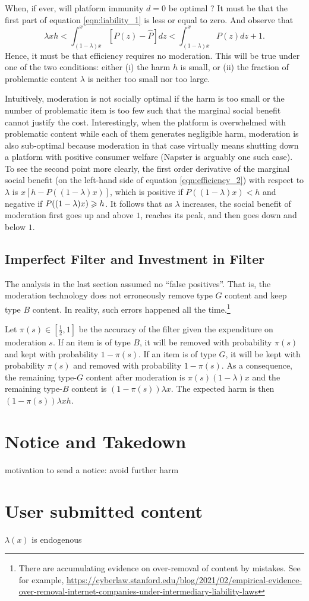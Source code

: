 When, if ever, will platform immunity $d=0$ be optimal ? It must be that the first part of equation \ref{eqn:liability_1} is less or equal to zero. And observe that 
\begin{equation*}
    \lambda xh < \int_{(1-\lambda)x}^x [P(z)-\hat{P}]dz < \int_{(1-\lambda)x}^x P(z)dz + 1.
\end{equation*}
Hence, it must be that efficiency requires no moderation. This will be true under one of the two conditions: either (i) the harm $h$ is small, or (ii) the fraction of problematic content $\lambda$ is neither too small nor too large. 

Intuitively, moderation is not socially optimal if the harm is too small or the number of problematic item is too few such that the marginal social benefit cannot justify the cost. Interestingly, when the platform is overwhelmed with problematic content while each of them generates negligible harm, moderation is also sub-optimal because moderation in that case virtually means shutting down a platform with positive consumer welfare (Napster is arguably one such case). 
To see the second point more clearly, the first order derivative of the marginal social benefit (on the left-hand side of equation \ref{eqn:efficiency_2}) with respect to $\lambda$ is $x[h-P((1-\lambda)x)]$, which is positive if $P((1-\lambda)x)<h$ and negative if $P((1-\lambda)x)\geqslant h$. It follows that as $\lambda$ increases, the social benefit of moderation first goes up and above $1$, reaches its peak, and then goes down and below $1$. 



\subsection{Imperfect Filter and Investment in Filter}
The analysis in the last section assumed no ``false positives''. That is, the moderation technology does not erroneously remove type $G$ content and keep type $B$ content. In reality, such errors happened all the time.\footnote{There are accumulating evidence on over-removal of content by mistakes. See for example, \url{https://cyberlaw.stanford.edu/blog/2021/02/empirical-evidence-over-removal-internet-companies-under-intermediary-liability-laws}}

Let $\pi(s)\in [\frac{1}{2},1]$ be the accuracy of the filter given the expenditure on moderation $s$. If an item is of type $B$, it will be removed with probability $\pi(s)$ and kept with probability $1-\pi(s)$. If an item is of type $G$, it will be kept with probability $\pi(s)$ and removed with probability $1-\pi(s)$. As a consequence, the remaining type-$G$ content after moderation is $\pi(s)(1-\lambda)x$ and the remaining type-$B$ content is $(1-\pi(s))\lambda x$. The expected harm is then $(1-\pi(s))\lambda xh$.

\section{Notice and Takedown}
motivation to send a notice: avoid further harm

\section{User submitted content}
$\lambda(x)$ is endogenous